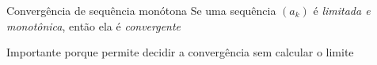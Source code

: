 \begin{frame}{Convergência de sequência monótona}
	Se uma sequência $(a_k)$ é \emph{limitada e monotônica}, então ela é \emph{convergente}

	\pause
	\vspace{2\baselineskip}
	Importante porque permite decidir a convergência sem calcular o limite
\end{frame}

\begin{frame}
  \tableofcontents
\end{frame}


